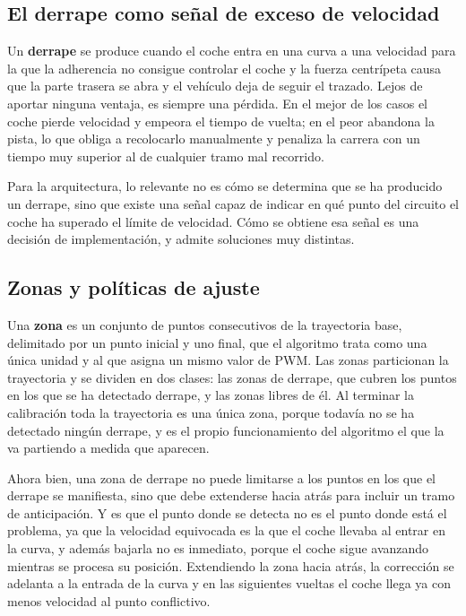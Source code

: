 \subsection{El derrape como señal de exceso de velocidad}
\label{subsec:derrape-arquitectura}
 
Un \textbf{derrape} se produce cuando el coche entra en una curva a una velocidad para la que la adherencia no consigue controlar el coche y la fuerza centrípeta causa que la parte trasera se abra y el vehículo deja de seguir el trazado. Lejos de aportar ninguna ventaja, es siempre una pérdida. En el mejor de los casos el coche pierde velocidad y empeora el tiempo de vuelta; en el peor abandona la pista, lo que obliga a recolocarlo manualmente y penaliza la carrera con un tiempo muy superior al de cualquier tramo mal recorrido.
 
Para la arquitectura, lo relevante no es cómo se determina que se ha producido un derrape, sino que existe una señal capaz de indicar en qué punto del circuito el coche ha superado el límite de velocidad. Cómo se obtiene esa señal es una decisión de implementación, y admite soluciones muy distintas.
 
\subsection{Zonas y políticas de ajuste}
\label{subsec:zonas-politicas}
Una \textbf{zona} es un conjunto de puntos consecutivos de la trayectoria base, delimitado por un punto inicial y uno final, que el algoritmo trata como una única unidad y al que asigna un mismo valor de PWM. Las zonas particionan la trayectoria y se dividen en dos clases: las zonas de derrape, que cubren los puntos en los que se ha detectado derrape, y las zonas libres de él. Al terminar la calibración toda la trayectoria es una única zona, porque todavía no se ha detectado ningún derrape, y es el propio funcionamiento del algoritmo el que la va partiendo a medida que aparecen.

Ahora bien, una zona de derrape no puede limitarse a los puntos en los que el derrape se manifiesta, sino que debe extenderse hacia atrás para incluir un tramo de anticipación. Y es que el punto donde se detecta no es el punto donde está el problema, ya que la velocidad equivocada es la que el coche llevaba al entrar en la curva, y además bajarla no es inmediato, porque el coche sigue avanzando mientras se procesa su posición. Extendiendo la zona hacia atrás, la corrección se adelanta a la entrada de la curva y en las siguientes vueltas el coche llega ya con menos velocidad al punto conflictivo.

